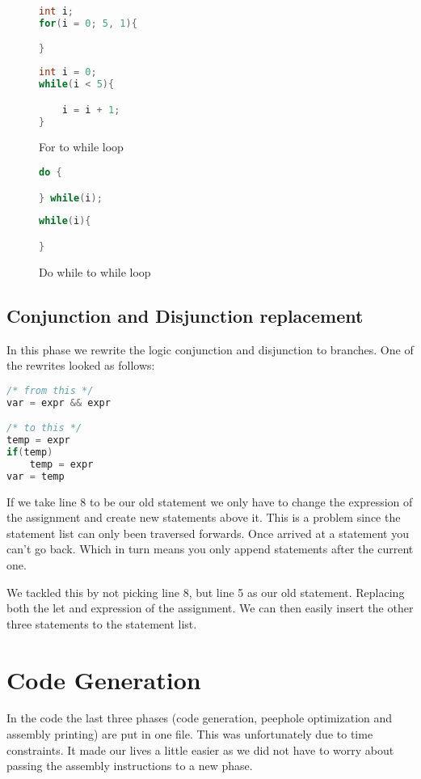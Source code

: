 \documentclass[a4paper]{article}
\begin{document}
\begin{figure}[h!]
\centering
\begin{lstlisting}[language=C]
int i;
for(i = 0; 5, 1){

}
\end{lstlisting}
\begin{lstlisting}[language=C]
int i = 0;
while(i < 5){

    i = i + 1;
}
\end{lstlisting}
\caption{For to while loop}
\label{fig:fortowhile}
\end{figure}

\begin{figure}[h!]
\centering
\begin{lstlisting}[language=C]
do {

} while(i);
\end{lstlisting}

\begin{lstlisting}[language=C]
while(i){

}
\end{lstlisting}
\caption{Do while to while loop}
\label{fig:dotowhile}
\end{figure}

\subsection{Conjunction and Disjunction replacement}
In this phase we rewrite the logic conjunction and disjunction to branches. One
of the rewrites looked as follows:
\begin{lstlisting}[language=C]
/* from this */
var = expr && expr

/* to this */
temp = expr
if(temp)
    temp = expr
var = temp
\end{lstlisting}

If we take line 8 to be our old statement we only have to change the expression
of the assignment and create new statements above it. This is a problem since
the statement list can only been traversed forwards. Once arrived at a
statement you can't go back. Which in turn means you only append statements
after the current one.

We tackled this by not picking line 8, but line 5 as our old statement. Replacing
both the let and expression of the assignment. We can then easily insert the
other three statements to the statement list.

\section{Code Generation}
In the code the last three phases (code generation, peephole optimization and
assembly printing) are put in one file. This was unfortunately due to time
constraints. It made our lives a little easier as we did not have to worry
about passing the assembly instructions to a new phase.
\end{document}
